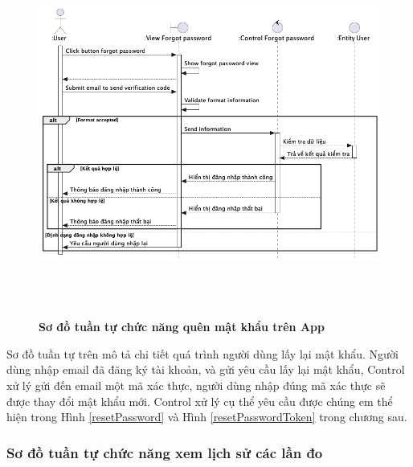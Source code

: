   \begin{figure}[H]
        \centering
        \includegraphics[width=16cm,height=12cm]{Images/mobile_app/forgot_password.png}
        \caption[Sơ đồ tuần tự chức năng quên mật khẩu trên App]{\bfseries \fontsize{12pt}{0pt}
        \selectfont Sơ đồ tuần tự chức năng quên mật khẩu trên App}
        \label{forgot_password} %
  \end{figure}

    Sơ đồ tuần tự trên mô tả chi tiết quá trình người dùng lấy lại mật khẩu. Người dùng nhập email đã đăng ký tài khoản,
  và gửi yêu cầu lấy lại mật khẩu, Control xử lý gửi đến email một mã xác thực, người dùng nhập đúng mã xác thực sẽ được thay
  đổi mật khẩu mới. Control xử lý cụ thể yêu cầu được chúng em thể hiện trong Hình \ref{resetPassword} và Hình \ref{resetPasswordToken} trong chương sau.

\subsubsection{Sơ đồ tuần tự chức năng xem lịch sử các lần đo}
\mbox{}

